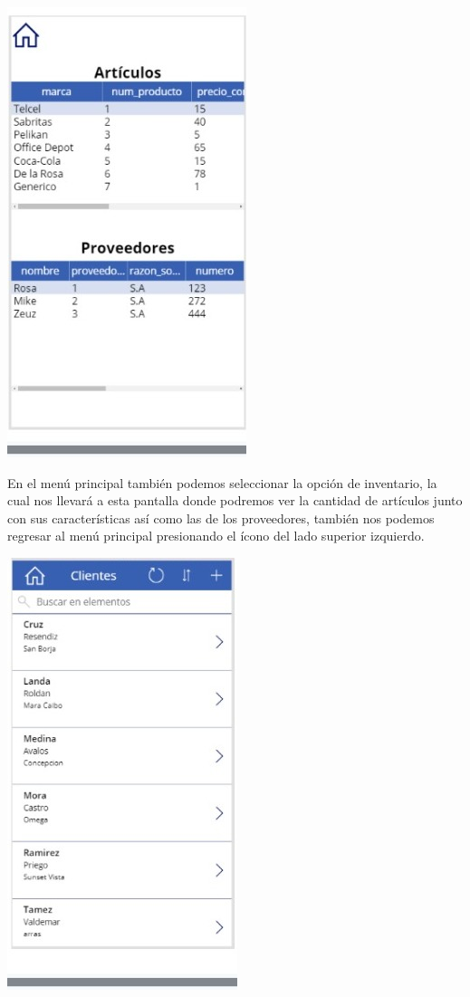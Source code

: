 \documentclass[letter,12pt]{article} %
\begin{document}
\begin{center} 
\includegraphics[scale=0.45]{imagenes/A05.jpeg}
\end{center} 
En el menú principal también podemos seleccionar la opción de inventario, la cual nos llevará a esta pantalla donde podremos ver la cantidad de artículos junto con sus características así como las de los proveedores, también nos podemos regresar al menú principal presionando el ícono del lado superior izquierdo.\\
\begin{center} 
\includegraphics[scale=0.45]{imagenes/A06.jpeg}
\end{center} 
\end{document}
